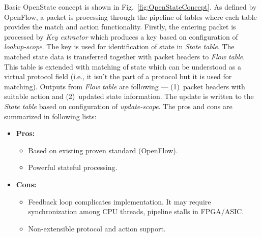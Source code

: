 Basic OpenState concept is shown in Fig.~\ref{fig:OpenStateConcept}. As defined by OpenFlow, a packet is processing through the 
pipeline of tables where each table provides the match and action functionality. 
Firstly, the entering packet is processed by \textit{Key extractor} which produces a key
based on configuration of \textit{lookup-scope}. The key is used for identification of state in \textit{State table}. 
The matched state data is transferred together with packet headers to \textit{Flow table}. This table is extended with matching of state which 
can be understood as a virtual protocol field (i.e., it isn't the part of a protocol but it is used for matching). 
Outputs from \textit{Flow table} are following --- (1)~packet headers with suitable action
and (2)~updated state information. The update is written to the \textit{State table} based on configuration of \textit{update-scope}. 
The pros and cons are summarized in following lists:
\begin{itemize}
    \item \textbf{Pros:}
        \begin{itemize}
            \item Based on existing proven standard (OpenFlow).
            \item Powerful stateful processing.
        \end{itemize}
    \item \textbf{Cons:}
        \begin{itemize}
            \item Feedback loop complicates implementation. It may require synchronization among CPU threads, pipeline stalls in FPGA/ASIC.
            \item Non-extensible protocol and action support.
        \end{itemize}
\end{itemize}

